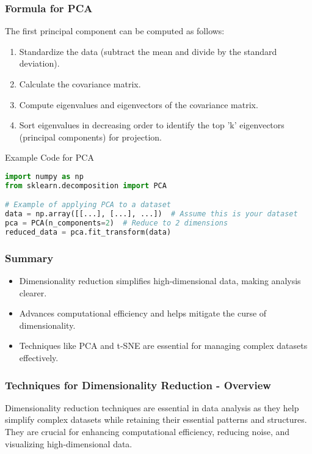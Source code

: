 \documentclass[aspectratio=169]{beamer}
\begin{document}
\begin{frame}[fragile]
    \frametitle{Formula for PCA}
    The first principal component can be computed as follows:
    \begin{enumerate}
        \item Standardize the data (subtract the mean and divide by the standard deviation).
        \item Calculate the covariance matrix.
        \item Compute eigenvalues and eigenvectors of the covariance matrix.
        \item Sort eigenvalues in decreasing order to identify the top 'k' eigenvectors (principal components) for projection.
    \end{enumerate}
    \begin{block}{Example Code for PCA}
    \begin{lstlisting}[language=Python]
import numpy as np
from sklearn.decomposition import PCA

# Example of applying PCA to a dataset
data = np.array([[...], [...], ...])  # Assume this is your dataset
pca = PCA(n_components=2)  # Reduce to 2 dimensions
reduced_data = pca.fit_transform(data)
    \end{lstlisting}
    \end{block}
\end{frame}

\begin{frame}[fragile]
    \frametitle{Summary}
    \begin{itemize}
        \item Dimensionality reduction simplifies high-dimensional data, making analysis clearer.
        \item Advances computational efficiency and helps mitigate the curse of dimensionality.
        \item Techniques like PCA and t-SNE are essential for managing complex datasets effectively.
    \end{itemize}
\end{frame}

\begin{frame}[fragile]
    \frametitle{Techniques for Dimensionality Reduction - Overview}
    Dimensionality reduction techniques are essential in data analysis as they help simplify complex datasets while retaining their essential patterns and structures. They are crucial for enhancing computational efficiency, reducing noise, and visualizing high-dimensional data.
\end{frame}
\end{document}
